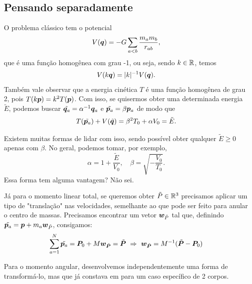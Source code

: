 \subsection{Pensando separadamente}
O problema clássico tem o potencial
\begin{equation}
    V(\bm q) = - G \sum_{a < b} \dfrac{m_a m_b}{r_{ab}},
\end{equation}
que é uma função homogênea com grau -1, ou seja, sendo $k \in \mathbb{R}$, temos
\begin{equation}
    V(k \bm q) = |k|^{-1} V(\bm q).
\end{equation}
Também vale observar que a energia cinética $T$ é uma função homogênea de grau 2, pois $T(k \bm p) = k^2 T(\bm p)$. Com isso, se quisermos obter uma determinada energia $\tilde E$, podemos buscar $\tilde{\bm q_a} = \alpha^{-1} \bm q_a$ e $\tilde{\bm p_a} = \beta \bm p_a$ de modo que
\begin{equation}
    T(\tilde{\bm p_a}) + V(\tilde{\bm q}) = \beta^2 T_0 + \alpha V_0 = \tilde E.
\end{equation}

Existem muitas formas de lidar com isso, sendo possível obter qualquer $\tilde E \geq 0$ apenas com $\beta$. No geral, podemos tomar, por exemplo,
\begin{equation}
    \alpha = 1 + \dfrac{\tilde E}{V_0},
    \quad
    \beta = \sqrt{-\dfrac{V_0}{T_0}}.
\end{equation}
Essa forma tem alguma vantagem? Não sei.

Já para o momento linear total, se queremos obter $\tilde P \in \mathbb{R}^3$ precisamos aplicar um tipo de "translação" nas velocidades, semelhante ao que pode ser feito para anular o centro de massas. Precisamos encontrar um vetor $\bm w_{\tilde P}$ tal que, definindo $\tilde{\bm p_a} = \bm p + m_a \bm w_{\tilde P}$, consigamos:
\begin{align}\label{eq:transformacao_momento_linear}
    \sum_{a=1}^N \tilde{\bm p_a} = \bm P_0 + M \bm w_{\tilde{\bm P}} = \tilde{\bm P} \
    \Rightarrow \ \bm w_{\tilde{\bm P}} = M^{-1} (\tilde{\bm P} - \bm P_0)
\end{align}

Para o momento angular, desenvolvemos independentemente uma forma de transformá-lo, mas que já constava em \cite[p.135]{aarseth_gravitational_2003} para um caso específico de 2 corpos.

